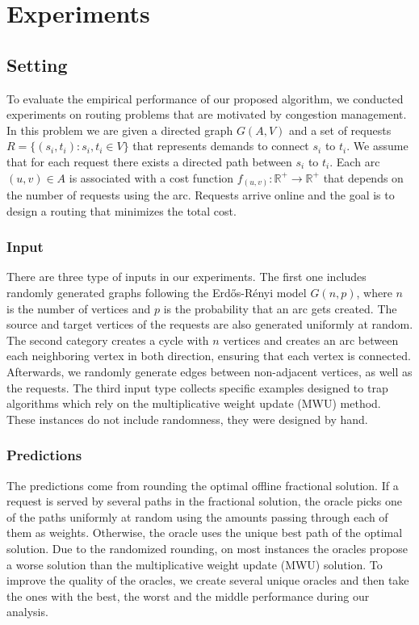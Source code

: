
\section{Experiments}

\subsection{Setting}
To evaluate the empirical performance of our proposed algorithm, we conducted experiments on routing problems
that are motivated by congestion management.
In this problem we are given a directed graph $G(A,V)$ and a set of requests $R = \{(s_{i}, t_{i}) : s_{i}, t_{i} \in V\}$ that represents demands to connect $s_{i}$ to $t_{i}$. We assume that for each request there exists a directed path between $s_{i}$ to $t_{i}$.
Each arc $(u, v) \in A$ is associated with a cost function $f_{(u,v)}: \mathbb{R}^{+} \rightarrow \mathbb{R}^{+}$ that depends on the number of requests using the arc.
Requests arrive online and the goal is to design a routing that minimizes the total cost.


\subsubsection{Input}
There are three type of inputs in our experiments. The first one includes randomly generated graphs following the Erd\H{o}s-Rényi model $G(n, p)$, where $n$ is the number of vertices and $p$ is the probability that an arc gets created. The source and target vertices of the requests are also generated uniformly at random. The second category creates a cycle with $n$ vertices and creates an arc between each neighboring vertex in both direction, ensuring that each vertex is connected. Afterwards, we randomly generate edges between non-adjacent vertices, as well as the requests.
The third input type collects specific examples designed to trap algorithms which rely on the multiplicative weight update (MWU) method. These instances do not include randomness, they were designed by hand.


\subsubsection{Predictions}
The predictions come from rounding the optimal offline fractional solution. If a request is served by several paths in the fractional solution, the oracle picks one of the paths uniformly at random using the amounts passing through each of them as weights. Otherwise, the oracle uses the unique best path of the optimal solution. Due to the randomized rounding, on most instances the oracles propose a worse solution than the multiplicative weight update (MWU) solution. To improve the quality of the oracles, we create several unique oracles and then take the ones with the best, the worst and the middle performance during our analysis.


